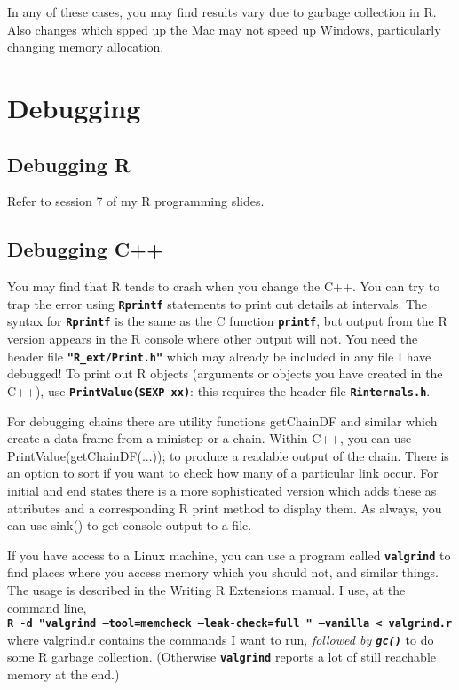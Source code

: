 \documentclass[12pt, a4paper]{article}
\renewcommand{\=}{\,=\,}
\newcommand{\+}{\,+\,}
\newcommand{\sfn}[1]{\textbf{\texttt{#1}}}
\begin{document}
In any of these cases, you may find results vary due to garbage
collection in R. Also changes which spped up the Mac may not speed up Windows,
particularly changing memory allocation.
\section{Debugging}

\subsection{Debugging R}
Refer to session 7 of my R programming slides.
\subsection{Debugging C++}
You may find that R tends to crash when you change the C++. You can try to trap
the error using \sfn{Rprintf} statements to print out details at intervals. The
syntax for \sfn{Rprintf} is the same as the C function \sfn{printf}, but output
from the R version appears in the R console where other output will not. You
need the header file \sfn{"R\_ext/Print.h"} which may already be
included in any file I have debugged! To print out R objects (arguments or
objects you have created in the C++), use
\sfn{PrintValue(SEXP xx)}: this requires the header file \sfn{Rinternals.h}.

For debugging chains there are utility functions \textsf{getChainDF} and similar
which create a data frame from a ministep or a chain. Within C++, you can use
\textsf{PrintValue(getChainDF(...));} to produce a readable output of the
chain. There is an option to sort if you want to check how many of a particular
link occur. For initial and end states there is a more sophisticated version
which adds these as attributes and a corresponding R print method to display
them. As always, you can use sink() to get console output to a file.

If you have access to a Linux machine, you can use a program called
\sfn{valgrind} to find places where you access memory which you should not, and
similar things. The usage is described in the Writing R Extensions manual. I
use, at the command line,\\
\sfn{R -d "valgrind --tool=memcheck --leak-check=full " --vanilla < valgrind.r}
\\
where valgrind.r contains the commands I want to run, \emph{followed by
  \sfn{gc()}} to do some R garbage collection. (Otherwise \sfn{valgrind} reports
a lot of still reachable memory at the end.)
\end{document}
